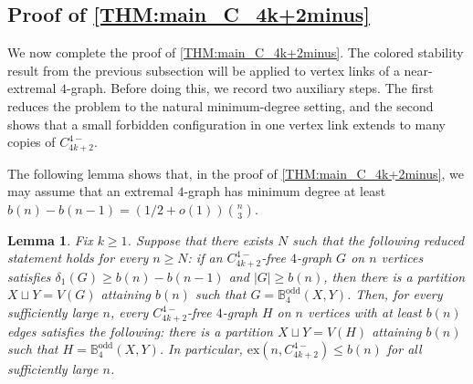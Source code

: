 \documentclass[10pt,a4paper]{article}
\theoremstyle{plain}
\newtheorem{lemma}[lemma]{Lemma}
\theoremstyle{definition}
\newcommand{\ex}{\mathrm{ex}}
\begin{document}
\subsection{Proof of \texorpdfstring{\cref{THM:main_C_4k+2minus}}{Theorem}}\label{SUBSEC:exact-main-proof}

We now complete the proof of \cref{THM:main_C_4k+2minus}.
The colored stability result from the previous subsection will be applied to vertex links of a near-extremal $4$-graph.
Before doing this, we record two auxiliary steps.
The first reduces the problem to the natural minimum-degree setting, and the second shows that a small forbidden configuration in one vertex link extends to many copies of $C_{4k+2}^{4-}$.

The following lemma shows that, in the proof of \cref{THM:main_C_4k+2minus}, we may assume that an extremal $4$-graph has minimum degree at least $b(n)-b(n-1) = (1/2+o(1))\binom n3$.


\begin{lemma}\label{lem:min-degree-reduction}
Fix $k\ge1$. Suppose that there exists $N$
such that the following reduced statement holds for every $n\ge N$: if an
$C_{4k+2}^{4-}$-free $4$-graph $G$ on $n$ vertices satisfies $\delta_1(G)\ge b(n)-b(n-1)$ and $|G|\ge b(n)$, then there is a partition $X\sqcup Y=V(G)$ attaining
$b(n)$ such that $G=\mathbb{B}_4^{\mathrm{odd}}(X,Y)$.
Then, for every sufficiently large $n$, every $C_{4k+2}^{4-}$-free $4$-graph $H$
on $n$ vertices with at least $b(n)$ edges satisfies the following:
there is a partition $X\sqcup Y=V(H)$ attaining $b(n)$ such that $H=\mathbb{B}_4^{\mathrm{odd}}(X,Y)$.
In particular, $\ex(n,C_{4k+2}^{4-})\le b(n)$ for all sufficiently large $n$.
\end{lemma}
\end{document}
